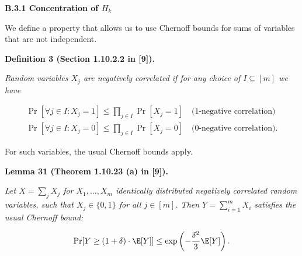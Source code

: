 \par\medskip\noindent\textbf{B.3.1 Concentration of $H_{k}$}\par




We define a property that allows us to use Chernoff bounds for sums of variables that are not independent.\par





\par\medskip\noindent\textbf{\textbf{Definition 3}\textbf{ }(Section 1.10.2.2 in [9])\textbf{.}}\par



\emph{Random variables $X_{j}$ are negatively correlated if for any choice of $I\subseteq[m]$ we have}\par


\[\begin{gathered}
\displaystyle\Pr[\forall j\in I:X_{j}=1] \displaystyle\leq\prod_{j\in I}{\Pr[X_{j}=1]}\quad\text{(1-negative correlation)} \\
\displaystyle\Pr[\forall j\in I:X_{j}=0] \displaystyle\leq\prod_{j\in I}{\Pr[X_{j}=0]}\quad\text{(0-negative correlation)}.
\end{gathered}\]






For such variables, the usual Chernoff bounds apply.\par





\par\medskip\noindent\textbf{\textbf{Lemma 31}\textbf{ }(Theorem 1.10.23 (a) in [9])\textbf{.}}\par



\emph{Let $X=\sum_{j}{X_{j}}$ for $X_{1},\dots,X_{m}$ identically distributed negatively correlated random variables, such that $X_{j}\in\{0,1\}$ for all $j\in[m]$.
Then $Y=\sum_{i=1}^{m}X_{i}$ satisfies the usual Chernoff bound:}\par


\[\begin{gathered}
\displaystyle\Pr[Y\geq(1+\delta)\cdot\E[Y]]\leq\exp\left(-\frac{\delta^{2}}{3}\E[Y]\right).
\end{gathered}\]



